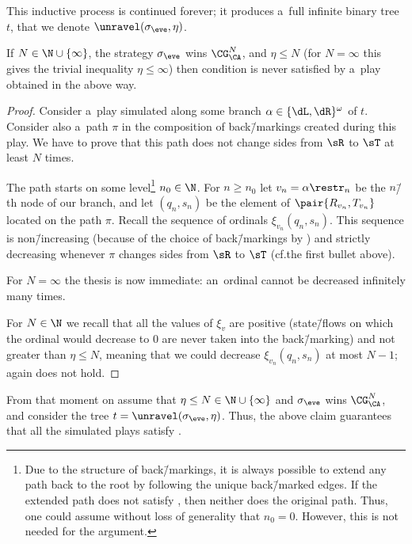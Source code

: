 This inductive process is continued forever; it produces a~full infinite binary tree $t$, that we denote $\unravel(\sigma_\eve, \eta)$.

\begin{clm}
	If $N\in\N\cup\{\infty\}$, the strategy $\sigma_\eve$ wins $\CG^N_\CA$, and $\eta\leq N$ (for $N=\infty$ this gives the trivial inequality $\eta\leq \infty$)
	then condition  is never satisfied by a~play obtained in the above way.
\end{clm}

\begin{proof}
	Consider a~play simulated along some branch $\alpha\in\{\dL,\dR\}^\omega$ of $t$.
	Consider also a~path $\pi$ in the composition of back\=/markings created during this play.
	We have to prove that this path does not change sides from $\sR$ to $\sT$ at least $N$ times.
		
	The path starts on some level\footnote{Due to the structure of back\=/markings, it is always possible to extend any path back to the root by following the unique back\=/marked edges. If the extended path does not satisfy , then neither does the original path. Thus, one could assume without loss of generality that $n_0=0$. However, this is not needed for the argument.} $n_0\in\N$.
	For $n\geq n_0$ let $v_n=\alpha\restr_n$ be the $n$\=/th node of our branch, and let $(q_n,s_n)$ be the element of $\pair{R_{v_n},T_{v_n}}$ located on the path $\pi$.
	Recall the sequence of ordinals $\xi_{v_n}(q_n,s_n)$.
	This sequence is non\=/increasing (because of the choice of back\=/markings by \adam) and strictly decreasing whenever $\pi$ changes sides from $\sR$ to $\sT$ (cf.\@ the first bullet above).
	
	For $N=\infty$ the thesis is now immediate: an~ordinal cannot be decreased infinitely many times.
	
	For $N\in\N$ we recall that all the values of $\xi_v$ are positive (state\=/flows on which the ordinal would decrease to $0$ are never taken into the back\=/marking) and not greater than $\eta\leq N$,
	meaning that we could decrease $\xi_{v_n}(q_n,s_n)$ at most $N{-}1$;
	again  does not hold.
\end{proof}

From that moment on assume that $\eta\leq N\in\N\cup\{\infty\}$ and $\sigma_\eve$ wins $\CG^N_\CA$, and consider the tree $t=\unravel(\sigma_\eve,\eta)$.
Thus, the above claim guarantees that all the simulated plays satisfy .

